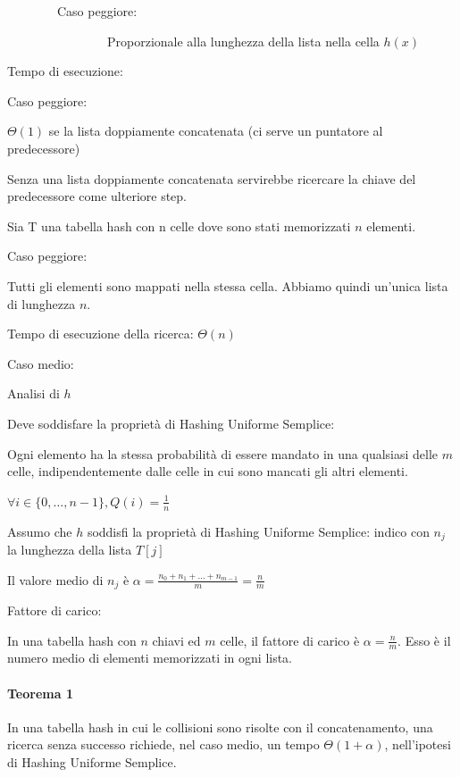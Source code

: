 \documentclass[tikz]{article}
\let\oldparagraph\paragraph
\renewcommand{\paragraph}[1]{\oldparagraph{#1}\mbox{}}
\begin{document}
{~~~~~~~~Caso peggiore:}

{~~~~~~~~~~~~~~~~Proporzionale alla lunghezza della lista nella cella $h(x)$}



{Tempo di esecuzione:}

{Caso peggiore:}

{$\Theta(1)$ se la lista doppiamente concatenata (ci serve un puntatore al predecessore)}

{Senza una lista doppiamente concatenata servirebbe ricercare la chiave del predecessore come ulteriore step.}

{Sia T una tabella hash con n celle dove sono stati memorizzati $n$ elementi. }

{Caso peggiore:}

{Tutti gli elementi sono mappati nella stessa cella. Abbiamo quindi
un'unica lista di lunghezza $n$.}

{Tempo di esecuzione della ricerca: $\Theta(n)$}

{Caso medio:}

{Analisi di $h$}

{Deve soddisfare la proprietà di }{Hashing Uniforme Semplice:}

{Ogni elemento ha la stessa probabilità di essere mandato in una qualsiasi delle $m$ celle, indipendentemente dalle celle in cui sono mancati gli altri elementi.}

$\forall i \in \{0,\ldots,n-1\}, Q(i) = \frac{1}{n}$

{Assumo che $h$ soddisfi la proprietà di Hashing Uniforme Semplice: indico con $n_j$ la lunghezza della lista $T[j]$}

{Il valore medio di $n_j$ è $\alpha=\frac{n_0+n_1+\ldots+n_{m-1}}{m}=\frac{n}{m}$}

{Fattore di carico: }

{In una tabella hash con $n$ chiavi ed $m$ celle, il fattore di carico è $\alpha = \frac{n}{m}$. Esso è il numero medio di elementi memorizzati in ogni lista.}

\paragraph{Teorema 1}

{In una tabella hash in cui le collisioni sono risolte con il concatenamento, una ricerca senza successo richiede, nel caso medio, un tempo $\Theta(1+\alpha)$, nell'ipotesi di Hashing Uniforme Semplice.}
\end{document}
